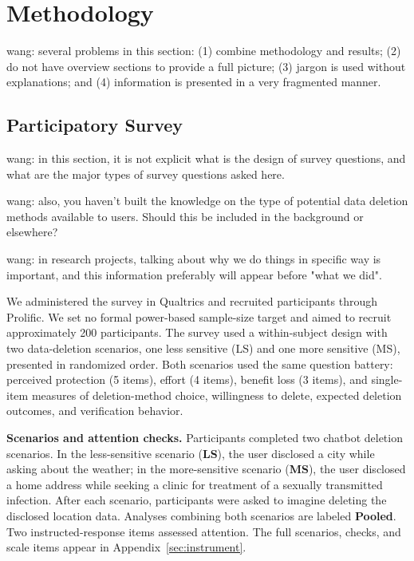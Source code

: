 \documentclass[conference,compsoc]{IEEEtran}
\newcommand{\xw}[1] {{\color{red}wang: #1}}
\begin{document}
\section{Methodology}
\label{sec:methodology}

\xw{several problems in this section: (1) combine methodology and results; (2) do not have overview sections to provide a full picture; (3) jargon is used without explanations; and (4) information is presented in a very fragmented manner. }

\subsection{Participatory Survey}
\label{sec:survey-methodology}

\xw{in this section, it is not explicit what is the design of survey questions, and what are the major types of survey questions asked here.}

\xw{also, you haven't built the knowledge on the type of potential data deletion methods available to users. Should this be included in the background or elsewhere?}

\xw{in research projects, talking about why we do things in specific way is important, and this information preferably will appear before "what we did".}

We administered the survey in Qualtrics and recruited participants through Prolific. We set no formal power-based sample-size target and aimed to recruit approximately 200 participants. The survey used a within-subject design with two data-deletion scenarios, one less sensitive (LS) and one more sensitive (MS), presented in randomized order. Both scenarios used the same question battery: perceived protection (5 items), effort (4 items), benefit loss (3 items), and single-item measures of deletion-method choice, willingness to delete, expected deletion outcomes, and verification behavior.

\textbf{Scenarios and attention checks.} Participants completed two chatbot deletion scenarios. In the less-sensitive scenario (\textbf{LS}), the user disclosed a city while asking about the weather; in the more-sensitive scenario (\textbf{MS}), the user disclosed a home address while seeking a clinic for treatment of a sexually transmitted infection. After each scenario, participants were asked to imagine deleting the disclosed location data. Analyses combining both scenarios are labeled \textbf{Pooled}. Two instructed-response items assessed attention. The full scenarios, checks, and scale items appear in Appendix~\ref{sec:instrument}.
\end{document}
